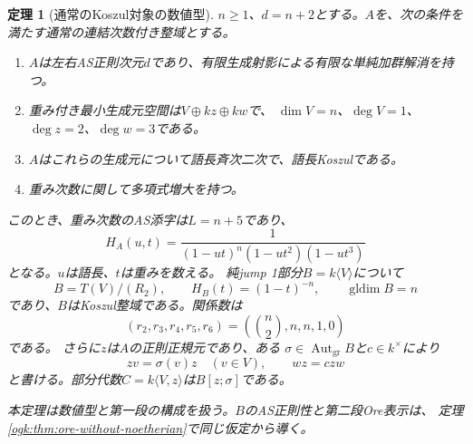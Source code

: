 \documentclass[11pt,a4paper]{ltjsarticle}
\newtheorem{theorem}{定理}[section]
\theoremstyle{definition}
\begin{document}
\begin{theorem}[通常のKoszul対象の数値型]\label{ogk:thm:numerics}
$n\geq1$、$d=n+2$とする。$A$を、次の条件を満たす通常の連結次数付き整域とする。
\begin{enumerate}
\item $A$は左右AS正則次元$d$であり、有限生成射影による有限な単純加群解消を持つ。
\item 重み付き最小生成元空間は$V\oplus kz\oplus kw$で、
$\dim V=n$、$\deg V=1$、$\deg z=2$、$\deg w=3$である。
\item $A$はこれらの生成元について語長斉次二次で、\emph{語長Koszul}である。
\item 重み次数に関して多項式増大を持つ。
\end{enumerate}
このとき、重み次数のAS添字は$L=n+5$であり、
\[
H_A(u,t)=\frac1{(1-ut)^n(1-ut^2)(1-ut^3)}
\]
となる。$u$は語長、$t$は重みを数える。
純jump 1部分$B=k\langle V\rangle$について
\[
B=T(V)/(R_2),\qquad H_B(t)=(1-t)^{-n},
\qquad\operatorname{gldim}B=n
\]
であり、$B$はKoszul整域である。関係数は
\[
(r_2,r_3,r_4,r_5,r_6)=\left(\binom n2,n,n,1,0\right)
\]
である。
さらに$z$は$A$の正則正規元であり、ある
$\sigma\in\operatorname{Aut}_{\mathrm{gr}}B$と$c\in k^\times$により
\[
zv=\sigma(v)z\quad(v\in V),\qquad wz=c zw
\]
と書ける。部分代数$C=k\langle V,z\rangle$は$B[z;\sigma]$である。

本定理は数値型と第一段の構成を扱う。$B$のAS正則性と第二段Ore表示は、
定理\ref{ogk:thm:ore-without-noetherian}で同じ仮定から導く。
\end{theorem}
\end{document}
